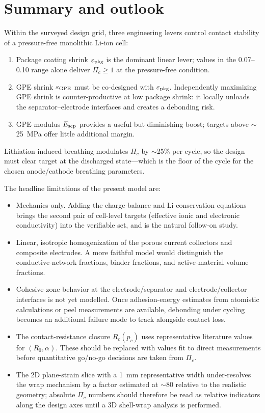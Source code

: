 \documentclass[11pt,letterpaper]{article}
\begin{document}
\section{Summary and outlook}

Within the surveyed design grid, three engineering levers control
contact stability of a pressure-free monolithic Li-ion cell:

\begin{enumerate}
\item Package coating shrink $\varepsilon_{\rm pkg}$ is the dominant
linear lever; values in the 0.07--0.10 range alone deliver $\Pi_c \ge
1$ at the pressure-free condition.
\item GPE shrink $\varepsilon_{\rm GPE}$ must be co-designed with
$\varepsilon_{\rm pkg}$.  Independently maximizing GPE shrink is
counter-productive at low package shrink: it locally unloads the
separator--electrode interfaces and creates a debonding risk.
\item GPE modulus $E_{\rm sep}$ provides a useful but diminishing
boost; targets above $\sim$25~MPa offer little additional margin.
\end{enumerate}

Lithiation-induced breathing modulates $\Pi_c$ by $\sim$25\% per
cycle, so the design must clear target at the discharged state---which
is the floor of the cycle for the chosen anode/cathode breathing
parameters.

The headline limitations of the present model are:

\begin{itemize}
\item Mechanics-only.  Adding the charge-balance and Li-conservation
equations brings the second pair of cell-level targets (effective
ionic and electronic conductivity) into the verifiable set, and is
the natural follow-on study.
\item Linear, isotropic homogenization of the porous current
collectors and composite electrodes.  A more faithful model would
distinguish the conductive-network fractions, binder fractions, and
active-material volume fractions.
\item Cohesive-zone behavior at the electrode/separator and
electrode/collector interfaces is not yet modelled.  Once
adhesion-energy estimates from atomistic calculations or peel
measurements are available, debonding under cycling becomes an
additional failure mode to track alongside contact loss.
\item The contact-resistance closure $R_c(p_c)$ uses representative
literature values for $(R_0, \alpha)$.  These should be replaced with
values fit to direct measurements before quantitative go/no-go
decisions are taken from $\Pi_c$.
\item The 2D plane-strain slice with a 1~mm representative width
under-resolves the wrap mechanism by a factor estimated at $\sim$80
relative to the realistic geometry; absolute $\Pi_c$ numbers should
therefore be read as relative indicators along the design axes until
a 3D shell-wrap analysis is performed.
\end{itemize}
\end{document}
